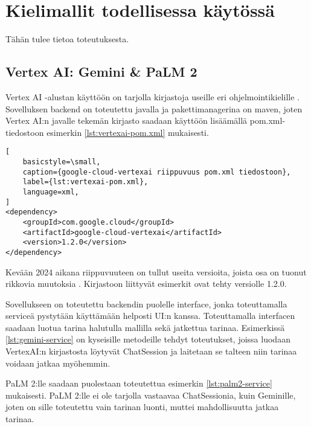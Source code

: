 \chapter{Kielimallit todellisessa käytössä}%
\label{ch:toteutus}

Tähän tulee tietoa toteutuksesta.

\section{Vertex AI: Gemini \& PaLM 2}

Vertex AI -alustan käyttöön on tarjolla kirjastoja useille eri
ohjelmointikielille \parencite{vertexAiGenerativeAiQuickstart}. Sovelluksen
backend on toteutettu javalla ja pakettimanagerina on maven, joten Vertex AI:n
javalle tekemän kirjasto saadaan käyttöön lisäämällä pom.xml-tiedostoon
esimerkin \ref{lst:vertexai-pom.xml} mukaisesti.

\begin{lstlisting}[
    basicstyle=\small,
    caption={google-cloud-vertexai riippuvuus pom.xml tiedostoon},
    label={lst:vertexai-pom.xml},
    language=xml,
]
<dependency>
    <groupId>com.google.cloud</groupId>
    <artifactId>google-cloud-vertexai</artifactId>
    <version>1.2.0</version>
</dependency>
\end{lstlisting}

Kevään 2024 aikana riippuvuuteen on tullut useita versioita, joista osa on
tuonut rikkovia muutoksia \parencite{mavenGoogleVertexAIAPI}. Kirjastoon
liittyvät esimerkit ovat tehty versiolle 1.2.0.

Sovellukseen on toteutettu backendin puolelle interface, jonka toteuttamalla
serviceä pystytään käyttämään helposti UI:n kanssa. Toteuttamalla interfacen
saadaan luotua tarina halutulla mallilla sekä jatkettua tarinaa. Esimerkissä
\ref{lst:gemini-service} on kyseisille metodeille tehdyt toteutukset, joissa
luodaan VertexAI:n kirjastosta löytyvät ChatSession ja laitetaan se talteen
niin tarinaa voidaan jatkaa myöhemmin.



PaLM 2:lle saadaan puolestaan toteutettua esimerkin \ref{lst:palm2-service}
mukaisesti. PaLM 2:lle ei ole tarjolla vastaavaa ChatSessionia, kuin Geminille,
joten on sille toteutettu vain tarinan luonti, muttei mahdollisuutta jatkaa
tarinaa.

